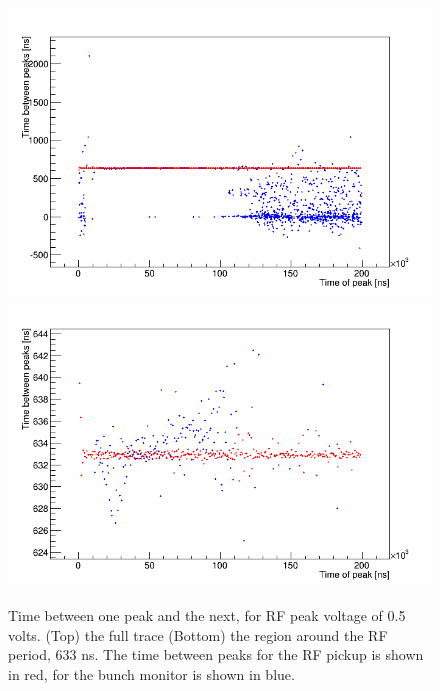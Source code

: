 \documentclass{paper}
\begin{document}
\begin{figure}
	\centering
		\includegraphics[width=\textwidth]{images/V=1_03_peak_deltas}
		\includegraphics[width=\textwidth]{images/V=1_03_peak_deltas_zoom}
	\caption{Time between one peak and the next, for RF peak voltage of 0.5
           volts. (Top) the full trace (Bottom) the region around the RF
           period, 633 ns. The time between peaks for the RF pickup is shown in
           red, for the bunch monitor is shown in blue.}
	\label{fig:peak_deltas}
\end{figure}
\end{document}
